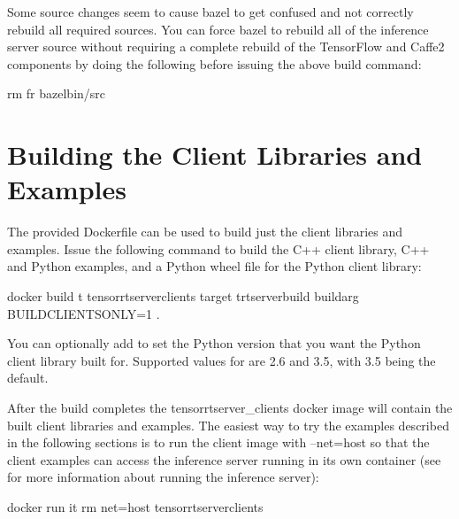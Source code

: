 \documentclass[letterpaper,10pt,english]{sphinxmanual}
\begin{document}
Some source changes seem to cause bazel to get confused and not
correctly rebuild all required sources. You can force bazel to rebuild
all of the inference server source without requiring a complete
rebuild of the TensorFlow and Caffe2 components by doing the following
before issuing the above build command:

\begin{sphinxVerbatim}[commandchars=\\\{\}]
\PYGZsh{} rm \PYGZhy{}fr bazel\PYGZhy{}bin/src
\end{sphinxVerbatim}


\section{Building the Client Libraries and Examples}
\label{\detokenize{build:building-the-client-libraries-and-examples}}\label{\detokenize{build:section-building-the-client-libraries-and-examples}}
The provided Dockerfile can be used to build just the client libraries
and examples. Issue the following command to build the C++ client
library, C++ and Python examples, and a Python wheel file for the
Python client library:

\begin{sphinxVerbatim}[commandchars=\\\{\}]
\PYGZdl{} docker build \PYGZhy{}t tensorrtserver\PYGZus{}clients \PYGZhy{}\PYGZhy{}target trtserver\PYGZus{}build \PYGZhy{}\PYGZhy{}build\PYGZhy{}arg \PYGZdq{}BUILD\PYGZus{}CLIENTS\PYGZus{}ONLY=1\PYGZdq{} .
\end{sphinxVerbatim}

You can optionally add  to set the Python
version that you want the Python client library built for. Supported
values for  are 2.6 and 3.5, with 3.5 being the default.

After the build completes the tensorrtserver\_clients docker image will
contain the built client libraries and examples. The easiest way to
try the examples described in the following sections is to run the
client image with --net=host so that the client examples can access
the inference server running in its own container (see
{\hyperref[\detokenize{run:section-running-the-inference-server}]{}} for more information about
running the inference server):

\begin{sphinxVerbatim}[commandchars=\\\{\}]
\PYGZdl{} docker run \PYGZhy{}it \PYGZhy{}\PYGZhy{}rm \PYGZhy{}\PYGZhy{}net=host tensorrtserver\PYGZus{}clients
\end{sphinxVerbatim}
\end{document}

